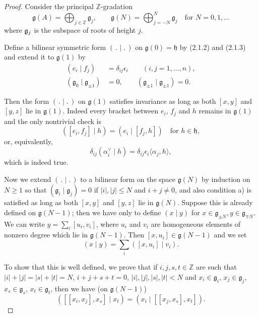 \documentclass[12pt]{article}
\begin{document}
\begin{proof}
    Consider the principal $\mathbb{Z}$-gradation
    \[
        \mathfrak{g}(A) = \bigoplus_{j \in \mathbb{Z}} \mathfrak{g}_j,
        \qquad
        \mathfrak{g}(N) = \bigoplus_{j=-N}^N \mathfrak{g}_j
        \quad \text{for } N=0,1,\ldots
    \] where $\mathfrak{g}_j$ is the subspace of roots of height $j$.

    Define a bilinear symmetric form $(\,.\mid.\,)$ on $\mathfrak{g}(0) = \mathfrak{h}$ by (2.1.2) and (2.1.3)
    and extend it to $\mathfrak{g}(1)$ by
    \begin{align}
        (e_i \mid f_j)                             & = \delta_{ij} \epsilon_i \qquad (i,j=1,\ldots,n), \\
        (\mathfrak{g}_0 \mid \mathfrak{g}_{\pm 1}) & = 0, \qquad
        (\mathfrak{g}_{\pm 1} \mid \mathfrak{g}_{\pm 1}) = 0.
    \end{align}

    Then the form $(\,.\mid.\,)$ on $\mathfrak{g}(1)$ satisfies invariance as long as both $[x,y]$ and $[y,z]$ lie in $\mathfrak{g}(1)$. Indeed every bracket between $e_i$, $f_j$ and $h$ remains in $\mathfrak{g}(1)$ and the only nontrivial check is
    \[
        ([e_i,f_j]\mid h) = (e_i \mid [f_j,h]) \quad \text{for } h \in \mathfrak{h},
    \]
    or, equivalently,
    \[
        \delta_{ij}(\alpha_i^\vee \mid h) = \delta_{ij}\epsilon_i \langle \alpha_j,h \rangle,
    \]
    which is indeed true.

    Now we extend $(\,.\mid.\,)$ to a bilinear form on the space $\mathfrak{g}(N)$ by induction on $N\geq 1$
    so that $(\mathfrak{g}_i \mid \mathfrak{g}_j)=0$ if $|i|,|j|\leq N$ and $i+j\neq 0$, and also condition a)
    is satisfied as long as both $[x,y]$ and $[y,z]$ lie in $\mathfrak{g}(N)$. Suppose this is already defined on $\mathfrak{g}(N-1)$;
    then we have only to define $(x\mid y)$ for $x \in \mathfrak{g}_{\pm N}, y \in \mathfrak{g}_{\mp N}$.
    We can write $y = \sum_i [u_i,v_i]$, where $u_i$ and $v_i$ are homogeneous elements of nonzero degree which lie in $\mathfrak{g}(N-1)$.
    Then $[x,u_i] \in \mathfrak{g}(N-1)$ and we set
    \[
        (x \mid y) = \sum_i ([x,u_i] \mid v_i).
    \]





    To show that this is well defined, we prove that if $i,j,s,t \in \mathbb{Z}$ are such that
    $|i|+|j|=|s|+|t|=N$, $i+j+s+t=0$, $|i|,|j|,|s|,|t|<N$ and $x_i \in \mathfrak{g}_i$,
    $x_j \in \mathfrak{g}_j$, $x_s \in \mathfrak{g}_s$, $x_t \in \mathfrak{g}_t$, then we have (on $\mathfrak{g}(N-1)$)
    \[
        ([[x_i,x_j],x_s]\mid x_t) = (x_i \mid [[x_j,x_s],x_t]).
    \]


\end{proof}
\end{document}
